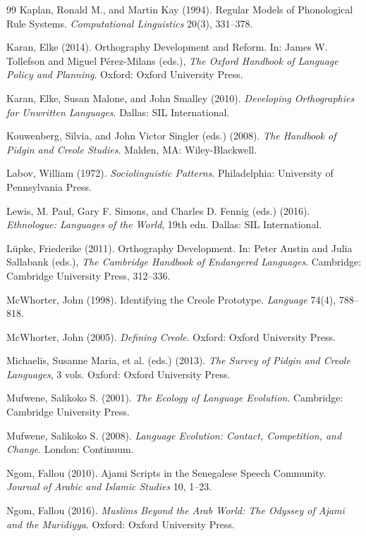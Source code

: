 \documentclass[12pt]{article}
\begin{document}
\begin{thebibliography}{99}
Kaplan, Ronald M., and Martin Kay (1994).
Regular Models of Phonological Rule Systems.
\textit{Computational Linguistics} 20(3), 331--378.

Karan, Elke (2014).
Orthography Development and Reform.
In: James W. Tollefson and Miguel Pérez-Milans (eds.),
\textit{The Oxford Handbook of Language Policy and Planning}.
Oxford: Oxford University Press.

Karan, Elke, Susan Malone, and John Smalley (2010).
\textit{Developing Orthographies for Unwritten Languages}.
Dallas: SIL International.

Kouwenberg, Silvia, and John Victor Singler (eds.) (2008).
\textit{The Handbook of Pidgin and Creole Studies}.
Malden, MA: Wiley-Blackwell.

Labov, William (1972).
\textit{Sociolinguistic Patterns}.
Philadelphia: University of Pennsylvania Press.

Lewis, M. Paul, Gary F. Simons, and Charles D. Fennig (eds.) (2016).
\textit{Ethnologue: Languages of the World}, 19th edn.
Dallas: SIL International.

Lüpke, Friederike (2011).
Orthography Development.
In: Peter Austin and Julia Sallabank (eds.),
\textit{The Cambridge Handbook of Endangered Languages}.
Cambridge: Cambridge University Press, 312--336.

McWhorter, John (1998).
Identifying the Creole Prototype.
\textit{Language} 74(4), 788--818.

McWhorter, John (2005).
\textit{Defining Creole}.
Oxford: Oxford University Press.

Michaelis, Susanne Maria, et al. (eds.) (2013).
\textit{The Survey of Pidgin and Creole Languages}, 3 vols.
Oxford: Oxford University Press.

Mufwene, Salikoko S. (2001).
\textit{The Ecology of Language Evolution}.
Cambridge: Cambridge University Press.

Mufwene, Salikoko S. (2008).
\textit{Language Evolution: Contact, Competition, and Change}.
London: Continuum.

Ngom, Fallou (2010).
Ajami Scripts in the Senegalese Speech Community.
\textit{Journal of Arabic and Islamic Studies} 10, 1--23.

Ngom, Fallou (2016).
\textit{Muslims Beyond the Arab World: The Odyssey of \textit{Ajam\={i}} and the Mur\={i}diyya}.
Oxford: Oxford University Press.


\end{thebibliography}
\end{document}
